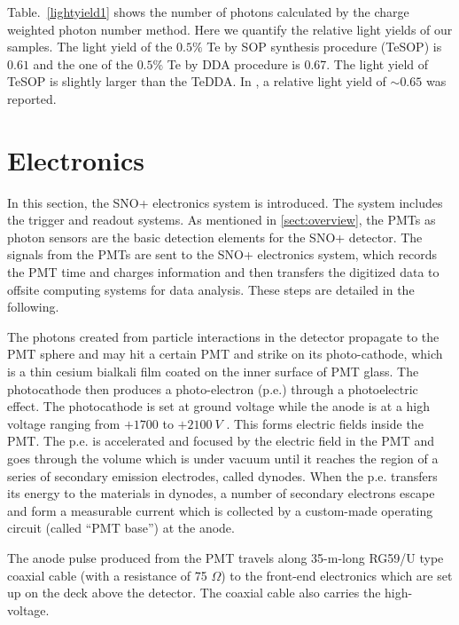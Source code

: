Table.~\ref{lightyield1} shows the number of photons calculated by the charge weighted photon number method. Here we quantify the relative light yields of our samples. The light yield of the $0.5\%$ Te by SOP synthesis procedure (TeSOP) is $0.61$ and the one of the $0.5\%$ Te by DDA procedure is 0.67. The light yield of TeSOP is slightly larger than the TeDDA. In \cite{biller2017new}, a relative light yield of $\sim 0.65$ was reported.

\section{Electronics}
In this section, the SNO+ electronics system is introduced. The system includes the trigger and readout systems. As mentioned in \ref{sect:overview}, the PMTs as photon sensors are the basic detection elements for the SNO+ detector. The signals from the PMTs are sent to the SNO+ electronics system, which records the PMT time and charges information and then transfers the digitized data to offsite computing systems for data analysis. These steps are detailed in the following.

The photons created from particle interactions in the detector propagate to the PMT sphere and may hit a certain PMT and strike on its photo-cathode, which is a thin cesium bialkali film coated on the inner surface of PMT glass. The photocathode then produces a photo-electron (p.e.) through a photoelectric effect. The photocathode is set at ground voltage while the anode is at a high voltage ranging from $+1700$ to $+2100~V$ \cite{boger2000sudbury,dunger2018topological}. This forms electric fields inside the PMT. The p.e. is accelerated and focused by the electric field in the PMT and goes through the volume which is under vacuum until it reaches the region of a series of secondary emission electrodes, called dynodes. When the p.e. transfers its energy to the materials in dynodes, a number of secondary electrons escape and form a measurable current which is collected by a custom-made operating circuit (called ``PMT base'') at the anode\cite{hamamatsu2018photomultiplier}.

The anode pulse produced from the PMT travels along 35-m-long RG59/U type coaxial cable (with a resistance of 75 $\Omega$) to the front-end electronics which are set up on the deck above the detector. The coaxial cable also carries the high-voltage\cite{boger2000sudbury}. 

